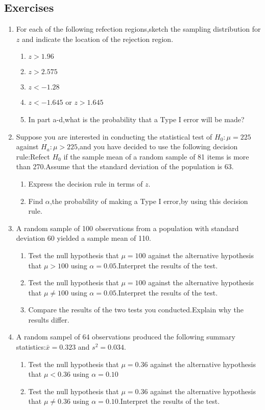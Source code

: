 \subsection{Exercises}
\begin{enumerate}
\item For each of the following refection regions,sketch the sampling distribution for $z$ and indicate the location of the rejection region.

\begin{enumerate}
\item $z>1.96$
\item $z>2.575$
\item $z<-1.28$
\item $z<-1.645$ or $z>1.645$
\item In part a-d,what is the probability that a Type I error will be made?
\end{enumerate}
\item Suppose you are interested in conducting the statistical test of $H_0:\mu=225$ against $H_a:\mu>225$,and you have decided to use the following decision rule:Refect $H_0$ if the sample mean of a random sample of 81 items is more than 270.Assume that the standard deviation of the population is 63.
\begin{enumerate}
\item  Express the decision rule in terms of $z$.
\item  Find $\alpha$,the probability of making a Type I error,by using this decision rule.
\end{enumerate}
\item A random sample of 100 observations from a population with standard deviation 60 yielded a sample mean of 110.
  \begin{enumerate}
\item Test the null hypothesis that $\mu=100$ against the alternative hypothesis that $\mu>100$ using $\alpha=0.05$.Interpret the results of the test.
\item Test the null hypothesis that $\mu=100$ against the alternative hypothesis that $\mu\neq100$ using $\alpha=0.05$.Interpret the results of the test.
\item Compare the results of the two tests you conducted.Explain why the results differ.
\end{enumerate}  
\item A random sampel of 64 observations produced the following summary statistics:$\bar{x}=0.323$ and $s^2=0.034$.
\begin{enumerate}
\item Test the null hypothesis that $\mu=0.36$ against the alternative hypothesis that $\mu<0.36$ using $\alpha=0.10$
\item Test the null hypothesis that $\mu=0.36$ against the alternative hypothesis that $\mu\neq0.36$ using $\alpha=0.10$.Interpret the results of the test.
\end{enumerate} 
\end{enumerate}
